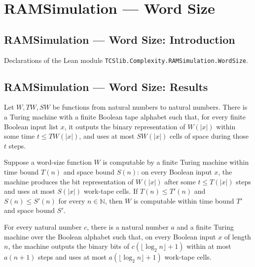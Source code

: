\section{RAMSimulation --- Word Size}
\subsection*{RAMSimulation --- Word Size: Introduction}

Declarations of the Lean module \texttt{TCSlib.Complexity.RAMSimulation.WordSize}.

\subsection*{RAMSimulation --- Word Size: Results}

\begin{definition}
\label{WordRAM.WordSizeComputable}
\leanok
{}
Let $W,TW,SW$ be functions from natural numbers to natural numbers. There is a Turing
machine with a finite Boolean tape alphabet such that, for every finite Boolean input
list $x$, it outputs the binary representation of $W(|x|)$ within some time $t\le
TW(|x|)$, and uses at most $SW(|x|)$ cells of space during those $t$ steps.
\end{definition}

\begin{theorem}
\label{WordRAM.WordSizeComputable.mono}
\leanok
{}
Suppose a word-size function $W$ is computable by a finite Turing machine within time
bound $T(n)$ and space bound $S(n)$: on every Boolean input $x$, the machine produces
the bit representation of $W(|x|)$ after some $t\le T(|x|)$ steps and uses at most
$S(|x|)$ work-tape cells. If $T(n)\le T'(n)$ and $S(n)\le S'(n)$ for every $n\in\mathbb
N$, then $W$ is computable within time bound $T'$ and space bound $S'$.
\end{theorem}

\begin{theorem}
\label{WordRAM.wordSizeComputable_logSpace}
\leanok
{}
For every natural number $c$, there is a natural number $a$ and a finite Turing machine
over the Boolean alphabet such that, on every Boolean input $x$ of length $n$, the
machine outputs the binary bits of $c(\lfloor\log_2 n\rfloor+1)$ within at most $a(n+1)$
steps and uses at most $a(\lfloor\log_2 n\rfloor+1)$ work-tape cells.
\end{theorem}

